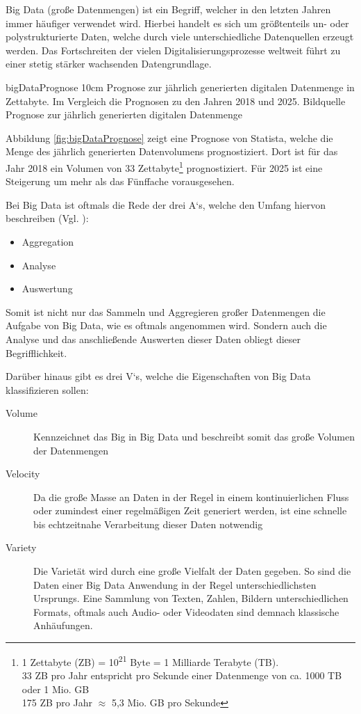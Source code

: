 Big Data (\glqq große Datenmengen\grqq) ist ein Begriff, welcher in den letzten Jahren immer häufiger verwendet wird.
Hierbei handelt es sich um größtenteils un- oder polystrukturierte Daten, welche durch viele unterschiedliche Datenquellen erzeugt werden.
Das Fortschreiten der vielen Digitalisierungsprozesse weltweit führt zu einer stetig stärker wachsenden Datengrundlage. 

\bild
{bigDataPrognose}
{10cm}
{Prognose zur jährlich generierten digitalen Datenmenge in Zettabyte. Im Vergleich die Prognosen zu den Jahren 2018 und 2025. Bildquelle }
{Prognose zur jährlich generierten digitalen Datenmenge}

Abbildung \ref{fig:bigDataPrognose} zeigt eine Prognose von Statista, welche die Menge des jährlich generierten Datenvolumens prognostiziert.
Dort ist für das Jahr 2018 ein Volumen von 33 Zettabyte\footnote{1 Zettabyte (ZB) = 10\textsuperscript{21} Byte = 1 Milliarde Terabyte (TB). \\
33 ZB pro Jahr entspricht pro Sekunde einer Datenmenge von ca. 1000 TB oder 1 Mio. GB \\
175 ZB pro Jahr $\approx$ 5,3 Mio. GB pro Sekunde} prognostiziert.
Für 2025 ist eine Steigerung um mehr als das Fünffache vorausgesehen.

Bei Big Data ist oftmals die Rede der drei A`s, welche den Umfang hiervon beschreiben (Vgl. \cite[2.1]{Hausler.2018}):
\begin{itemize}
\item Aggregation
\item Analyse
\item Auswertung
\end{itemize}
Somit ist nicht nur das Sammeln und Aggregieren großer Datenmengen die Aufgabe von Big Data, wie es oftmals angenommen wird.
Sondern auch die Analyse und das anschließende Auswerten dieser Daten obliegt dieser Begrifflichkeit.


Darüber hinaus gibt es drei V`s, welche die Eigenschaften von Big Data klassifizieren sollen:
\begin{description}
\item[Volume] Kennzeichnet das \glqq Big\grqq{} in Big Data und beschreibt somit das große Volumen der Datenmengen
\item[Velocity] Da die große Masse an Daten in der Regel in einem kontinuierlichen Fluss oder zumindest einer regelmäßigen Zeit generiert werden, ist eine schnelle bis echtzeitnahe Verarbeitung dieser Daten notwendig 
\item[Variety] Die Varietät wird durch eine große Vielfalt der Daten gegeben.
So sind die Daten einer Big Data Anwendung in der Regel unterschiedlichsten Ursprungs. 
Eine Sammlung von Texten, Zahlen, Bildern unterschiedlichen Formats, oftmals auch Audio- oder Videodaten sind demnach klassische Anhäufungen. 
\end{description}


